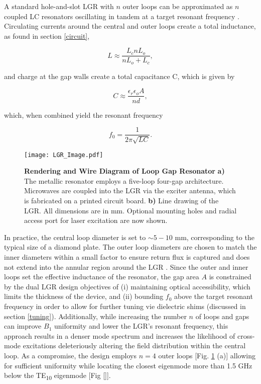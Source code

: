 A standard hole-and-slot LGR with $n$ outer loops can be approximated as $n$ coupled LC resonators oscillating in tandem at a target resonant frequency \cite{wood1984loop}. Circulating currents around the central and outer loops create a total inductance, as found in section \ref{circuit}, 


\begin{equation}
L \approx \frac{L_c n L_o}{n L_o + L_c},
\end{equation}\label{induct}

and charge at the gap walls create a total capacitance C, which is given by

\begin{equation}
C \approx \frac{\epsilon_r \epsilon_o A}{nd},
\end{equation} \label{cap}

which, when combined yield the resonant frequency

\begin{equation}
f_0 = \frac{1}{2 \pi \sqrt{LC}}.
\end{equation}

\begin{figure}[t!]
\centering
\texttt{[image: LGR\_Image.pdf]}  
\caption{\textbf{Rendering and Wire Diagram of Loop Gap Resonator} \textbf{a)} The metallic resonator employs a five-loop four-gap architecture. Microwaves are coupled into the LGR via the exciter antenna, which is fabricated on a printed circuit board. \textbf{b)} Line drawing of the LGR. All dimensions are in mm. Optional mounting holes and radial access port for laser excitation are now shown.}
\label{LGR_drawing}
\end{figure}

In practice, the central loop diameter is set to $\sim 5-10 $ mm, corresponding to the typical size of a diamond plate. The outer loop diameters are chosen to match the inner diameters within a small factor to ensure return flux is captured and does not extend into the annular region around the LGR \cite{}. Since the outer and inner loops set the effective inductance of the resonator, the gap area $A$ is constrained by the dual LGR design objectives of (i) maintaining optical accessibility, which limits the thickness of the device, and (ii) bounding $f_0$ above the target resonant frequency in order to allow for further tuning vie dielectric shims (discussed in section \ref{tuning}). Additionally, while increasing the number $n$ of loops and gaps can improve $B_1$ uniformity \cite{piasecki1993field} and lower the LGR's resonant frequency, this approach results in a denser mode spectrum \cite{froncisz1982loop} and increases the likelihood of cross-mode excitations deleteriously altering the field distribution within the central loop. As a compromise, the design employs $n=4$ outer loops [Fig. \ref{LGR_drawing} (a)] allowing for sufficient uniformity while locating the closest eigenmode more than 1.5 GHz below the TE\textsubscript{10} eigenmode [Fig \ref{}].  

